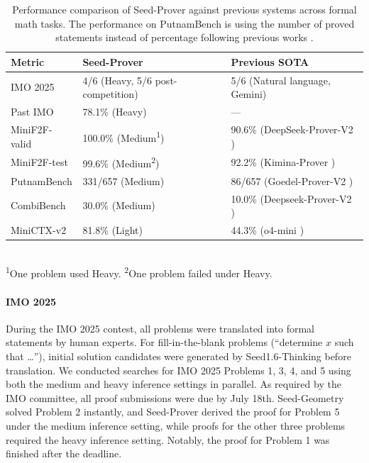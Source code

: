 \begin{table}[t]
\centering
\caption{Performance comparison of Seed-Prover against previous systems across formal math tasks. The performance on PutnamBench is using the number of proved statements instead of percentage following previous works \citep{tsoukalasputnambench}.}
\begin{tabular}{lll}
\toprule
\textbf{Metric}               & \textbf{Seed-Prover}                              & \textbf{Previous SOTA}                     \\ \midrule
IMO 2025                      & 4/6 (Heavy, 5/6 post-competition)                       & 5/6 (Natural language, Gemini)\\
Past IMO                      & 78.1\% (Heavy)                                      & —                                          \\
MiniF2F-valid                 & 100.0\% (Medium\textsuperscript{1})              & 90.6\% (DeepSeek-Prover-V2 \citep{deepseek-v2})                \\
MiniF2F-test                  & 99.6\% (Medium\textsuperscript{2})                                     & 92.2\% (Kimina-Prover \citep{kimina})                     \\
PutnamBench                   & 331/657 (Medium)                                  & 86/657 (Goedel-Prover-V2 \citep{lin2025goedel})                  \\
CombiBench                    & 30.0\% (Medium)                                     & 10.0\% (Deepseek-Prover-V2 \citep{deepseek-v2})                  \\
MiniCTX-v2                    & 81.8\% (Light)                                    & 44.3\% (o4-mini \citep{minictx_leaderboard_website})                           \\ \bottomrule
\end{tabular}
{\\ \footnotesize
\textsuperscript{1}One problem used Heavy.
\textsuperscript{2}One problem failed under Heavy.}
\label{tab:seed_prover_performance}
\end{table}

\paragraph{IMO 2025} During the IMO 2025 contest, all problems were translated into formal statements by human experts. For fill-in-the-blank problems (``determine $x$ such that \dots''), initial solution candidates were generated by Seed1.6-Thinking before translation. We conducted searches for IMO 2025 Problems 1, 3, 4, and 5 using both the medium and heavy inference settings in parallel. As required by the IMO committee, all proof submissions were due by July 18th. Seed-Geometry solved Problem 2 instantly, and Seed-Prover derived the proof for Problem 5 under the medium inference setting, while proofs for the other three problems required the heavy inference setting. Notably, the proof for Problem 1 was finished after the deadline.


